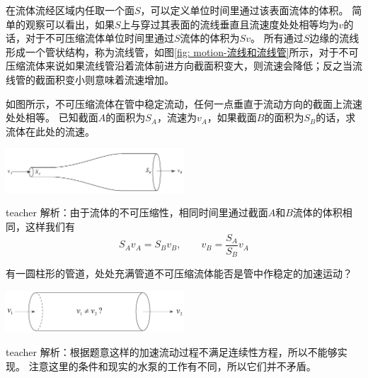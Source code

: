 在流体流经区域内任取一个面$S$，可以定义单位时间里通过该表面流体的体积。
简单的观察可以看出，如果$S$上与穿过其表面的流线垂直且流速度处处相等均为$v$的话，对于不可压缩流体单位时间里通过$S$流体的体积为$Sv$。
所有通过$S$边缘的流线形成一个管状结构，称为{\heiti 流线管}，如图\ref{fig: motion-流线和流线管}所示，对于不可压缩流体来说如果流线管沿着流体前进方向截面积变大，则流速会降低；反之当流线管的截面积变小则意味着流速增加。

\begin{example}
如图所示，不可压缩流体在管中稳定流动，任何一点垂直于流动方向的截面上流速处处相等。
已知截面$A$的面积为$S_A$，流速为$v_A$，如果截面$B$的面积为$S_B$的话，求流体在此处的流速。
\begin{flushright}
\includegraphics[width = 0.5\textwidth]{images/motion-48.pdf} 
\end{flushright}
\begin{taggedblock}{teacher}
\noindent
解析：由于流体的不可压缩性，相同时间里通过截面$A$和$B$流体的体积相同，这样我们有
\[S_Av_A = S_Bv_B,\qquad v_B =  \frac{S_A}{S_B}v_A \]
\end{taggedblock}
\end{example}

\begin{example}
有一圆柱形的管道，处处充满管道不可压缩流体能否是管中作稳定的加速运动？
\begin{flushright}
\includegraphics[width = 0.5\textwidth]{images/motion-49.pdf} 
\end{flushright}
\begin{taggedblock}{teacher}
\noindent
解析：根据题意这样的加速流动过程不满足连续性方程，所以不能够实现。
注意这里的条件和现实的水泵的工作有不同，所以它们并不矛盾。
\end{taggedblock}
\end{example}

